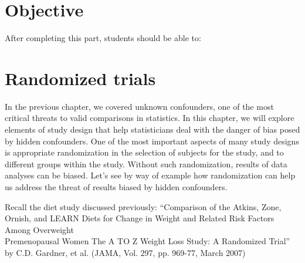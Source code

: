 \documentclass[11pt]{book}\usepackage[]{graphicx}\usepackage[]{color}
\begin{document}
\section{Objective}

After completing this part, students should be able to:


\section{Randomized trials}

In the previous chapter, we covered unknown confounders, one of the most critical threats to valid comparisons in statistics. In this chapter, we will explore elements of study design that help statisticians deal with the danger of bias posed by hidden confounders. One of the most important aspects of many study designs is appropriate randomization in the selection of subjects for the study, and to different groups within the study. Without such randomization, results of data analyses can be biased. Let's see by way of example how randomization can help us address the threat of results biased by hidden confounders.

Recall the diet study discussed previously: ``Comparison of the Atkins, Zone, Ornish, and LEARN Diets for Change in Weight and Related Risk Factors Among Overweight \\ Premenopausal Women The A TO Z Weight Loss Study: A Randomized Trial'' by C.D. Gardner, et al. (JAMA, Vol. 297, pp. 969-77, March 2007)
\end{document}

